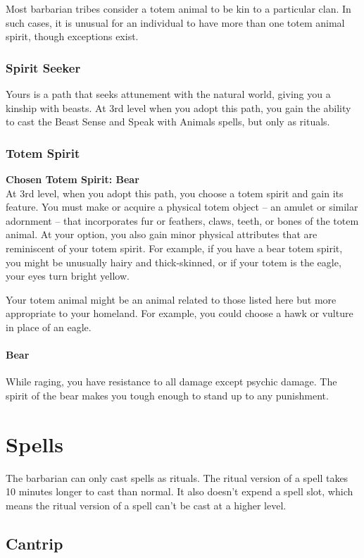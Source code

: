 \documentclass[letterpaper,openany,oneside,twocolumn]{book}
\begin{document}
Most barbarian tribes consider a totem animal to be kin to a particular clan. In such cases, it is unusual for an individual to have more than one totem animal spirit, though exceptions exist.
\subsubsection*{Spirit Seeker}
Yours is a path that seeks attunement with the natural world, giving you a kinship with beasts. At 3rd level when you adopt this path, you gain the ability to cast the Beast Sense and Speak with Animals spells, but only as rituals.
\subsubsection*{Totem Spirit}
\textbf{Chosen Totem Spirit: Bear}\\
At 3rd level, when you adopt this path, you choose a totem spirit and gain its feature. You must make or acquire a physical totem object – an amulet or similar adornment – that incorporates fur or feathers, claws, teeth, or bones of the totem animal. At your option, you also gain minor physical attributes that are reminiscent of your totem spirit. For example, if you have a bear totem spirit, you might be unusually hairy and thick-skinned, or if your totem is the eagle, your eyes turn bright yellow.

Your totem animal might be an animal related to those listed here but more appropriate to your homeland. For example, you could choose a hawk or vulture in place of an eagle.

\paragraph*{Bear} While raging, you have resistance to all damage except psychic damage. The spirit of the bear makes you tough enough to stand up to any punishment.

\section*{Spells}
The barbarian can only cast spells as rituals. The ritual version of a spell takes 10 minutes longer to cast than normal. It also doesn't expend a spell slot, which means the ritual version of a spell can't be cast at a higher level.

\subsection*{Cantrip}
\end{document}

